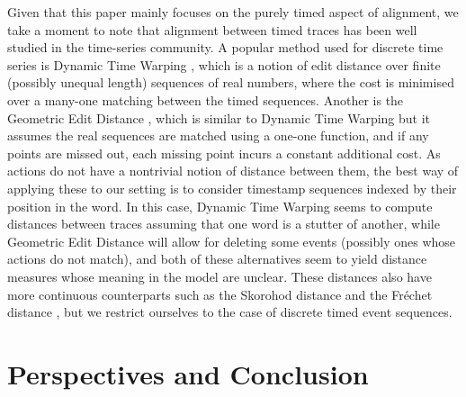 \documentclass[conference]{IEEEtran}
\begin{document}
		Given that this paper mainly focuses on the purely timed aspect of alignment, we take a moment to note that alignment between timed traces has been well studied in the time-series community. 
A popular method used for discrete time series is Dynamic Time Warping \cite{DTW}, which is a notion of edit distance over finite (possibly unequal length) sequences of real numbers, where the cost is minimised over a many-one matching between the timed sequences. 
Another is the Geometric Edit Distance \cite{GEdit}, which is similar to Dynamic Time Warping but it assumes the real sequences are matched using a one-one function, and if any points are missed out, each missing point incurs a constant additional cost. 
As actions do not have a nontrivial notion of distance between them, the best way of applying these to our setting is to consider timestamp sequences indexed by their position in the word. 
In this case, Dynamic Time Warping seems to compute distances between traces assuming that one word is a stutter of another, while Geometric Edit Distance will allow for deleting some events (possibly ones whose actions do not match), and both of these alternatives seem to yield distance measures whose meaning in the model are unclear. 
These distances also have more continuous counterparts such as the Skorohod distance \cite{skorokhod1956limit} and the Fr\'echet distance \cite{frechet1906quelques}, but we restrict ourselves to the case of discrete timed event sequences. 

		
		\section{Perspectives and Conclusion}\label{conc}
		
\end{document}
